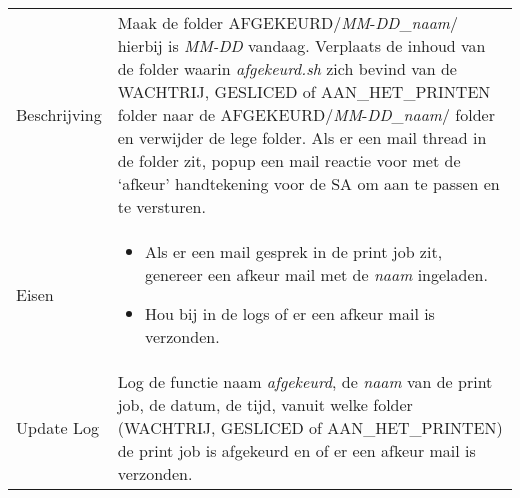 \documentclass{article}
\begin{document}
\begin{table}[H]
    \centering
    \begin{tabular}%
    {>{\raggedright\arraybackslash}p{}%
    |>{\raggedright\arraybackslash}p{}}
    \rowcolor{myblue} \multicolumn{2}{c}{\rule{0pt}{13pt}Functie: {\Large afgekeurd.sh}} \\\hline
    Beschrijving & Maak de folder AFGEKEURD/\textit{MM}-\textit{DD}\_\textit{naam}/ hierbij is \textit{MM-DD} vandaag. Verplaats de inhoud van de folder waarin \textit{afgekeurd.sh} zich bevind van de WACHTRIJ, GESLICED of AAN\_HET\_PRINTEN folder naar de AFGEKEURD/\textit{MM}-\textit{DD}\_\textit{naam}/ folder en verwijder de lege folder. Als er een mail thread in de folder zit, popup een mail reactie voor met de `afkeur' handtekening voor de SA om aan te passen en te versturen.\\
    Eisen & 
    \begin{itemize} 
\item Als er een mail gesprek in de print job zit, genereer een afkeur mail met de \textit{naam} ingeladen.
\item Hou bij in de logs of er een afkeur mail is verzonden.
\end{itemize} \\
  Update Log& Log de functie naam \textit{afgekeurd}, de \textit{naam} van de print job, de datum, de tijd, vanuit welke folder (WACHTRIJ, GESLICED of AAN\_HET\_PRINTEN) de print job is afgekeurd en of er een afkeur mail is verzonden.\\
    \end{tabular}
\end{table}
\end{document}
